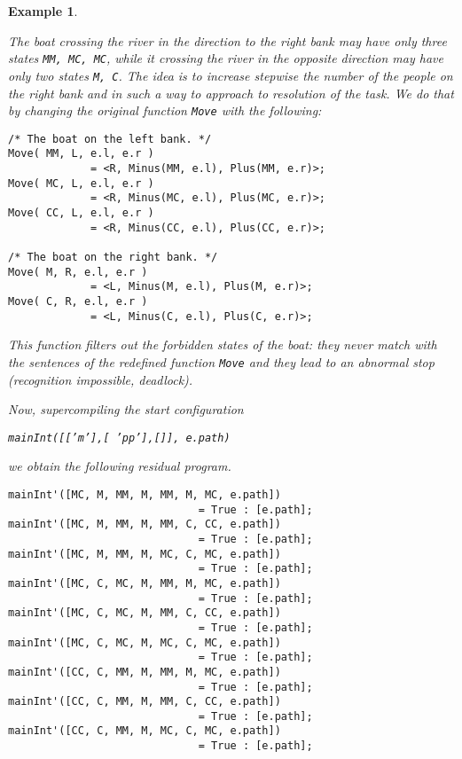 \documentclass[preprint]{sigplanconf}
\newtheorem{example}{Example}
\begin{document}
\begin{example}\label{Example6}

The boat crossing the river in the direction to the right bank may have only three states \texttt{MM, MC, MC}, while it crossing the river in the opposite direction may have only two states \texttt{M, C}. The idea is to increase stepwise the number of the people on the right bank and in such a way to approach to resolution of the task. We do that by changing the original function \texttt{Move} with the following:


\noindent
\begin{verbatim}
/* The boat on the left bank. */
Move( MM, L, e.l, e.r ) 
             = <R, Minus(MM, e.l), Plus(MM, e.r)>;
Move( MC, L, e.l, e.r ) 
             = <R, Minus(MC, e.l), Plus(MC, e.r)>;
Move( CC, L, e.l, e.r ) 
             = <R, Minus(CC, e.l), Plus(CC, e.r)>;

/* The boat on the right bank. */
Move( M, R, e.l, e.r ) 
             = <L, Minus(M, e.l), Plus(M, e.r)>;
Move( C, R, e.l, e.r ) 
             = <L, Minus(C, e.l), Plus(C, e.r)>;
\end{verbatim}


This function filters out the forbidden states of the boat: they never match with the sentences of the redefined function \texttt{Move} and they lead to an abnormal stop (recognition impossible, deadlock).

Now, supercompiling the start configuration 
\begin{center}
\texttt{mainInt([['m'],[ 'pp'],[]], e.path)}
\end{center}
we obtain the following residual program.

\noindent
\begin{verbatim}
mainInt'([MC, M, MM, M, MM, M, MC, e.path]) 
                              = True : [e.path];
mainInt'([MC, M, MM, M, MM, C, CC, e.path]) 
                              = True : [e.path];
mainInt'([MC, M, MM, M, MC, C, MC, e.path]) 
                              = True : [e.path];
mainInt'([MC, C, MC, M, MM, M, MC, e.path]) 
                              = True : [e.path];
mainInt'([MC, C, MC, M, MM, C, CC, e.path]) 
                              = True : [e.path];
mainInt'([MC, C, MC, M, MC, C, MC, e.path]) 
                              = True : [e.path];
mainInt'([CC, C, MM, M, MM, M, MC, e.path]) 
                              = True : [e.path];
mainInt'([CC, C, MM, M, MM, C, CC, e.path]) 
                              = True : [e.path];
mainInt'([CC, C, MM, M, MC, C, MC, e.path]) 
                              = True : [e.path];
\end{verbatim}



\end{example}
\end{document}

